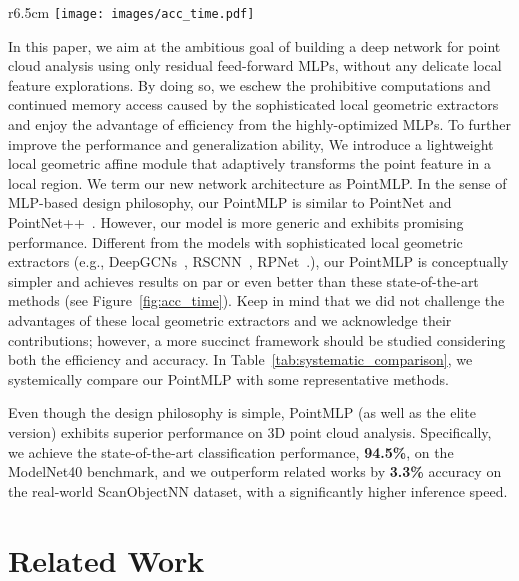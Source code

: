 \documentclass{article} \usepackage{iclr2022_conference,times}
\begin{document}
\begin{wrapfigure}{r}{6.5cm}
    \centering
    \vspace{-2mm}
    \texttt{[image: images/acc\_time.pdf]}
    \vspace{-6mm}
    \caption{Accuracy-speed tradeoff on ModelNet40. Our PointMLP performs best. Please refer to Section~\ref{sec:experiments} for details.}
    \vspace{-2mm}
    \label{fig:acc_time}
\end{wrapfigure}
In this paper, we aim at the ambitious goal of building a deep network for point cloud analysis using only residual feed-forward MLPs, without any delicate local feature explorations. By doing so, we eschew the prohibitive computations and continued memory access caused by the sophisticated local geometric extractors and enjoy the advantage of efficiency from the highly-optimized MLPs. To further improve the performance and generalization ability,
We introduce a lightweight local geometric affine module that adaptively transforms the point feature in a local region. We term our new network architecture as PointMLP. In the sense of MLP-based design philosophy, our PointMLP is similar to PointNet and PointNet++~\citep{qi2017pointnet, qi2017pointnet++}. However, our model is more generic and exhibits promising performance. Different from the models with sophisticated local geometric extractors (e.g., DeepGCNs~\citep{li2019deepgcns}, RSCNN~\citep{liu2019relation}, RPNet~\citep{ran2021learning}.), our PointMLP is conceptually simpler and achieves results on par or even better than these state-of-the-art methods (see Figure~\ref{fig:acc_time}). Keep in mind that we did not challenge the advantages of these local geometric extractors and we acknowledge their contributions; however, a more succinct framework should be studied considering both the efficiency and accuracy.
In Table~\ref{tab:systematic_comparison}, we systemically compare our PointMLP with some representative methods.

Even though the design philosophy is simple, PointMLP (as well as the elite version) exhibits superior performance on 3D point cloud analysis. Specifically, we achieve the state-of-the-art classification performance, \textbf{94.5\%}, on the ModelNet40 benchmark, and we outperform related works by \textbf{3.3\%} accuracy on the real-world ScanObjectNN dataset, with a significantly higher inference speed.

\section{Related Work}
\label{sec:related_work}
\end{document}
